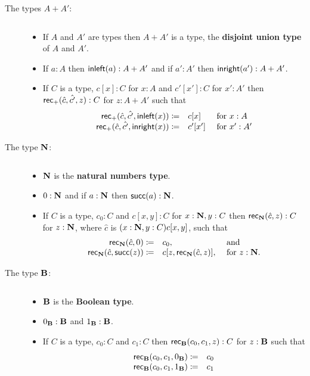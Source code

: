 {{\begin{description}
\item[The types $A+A'$:] $\;$
\begin{itemize}
\item If $A$ and $A'$ are types then $A+A'$ is a type, the {\bf disjoint union
type} of $A$ and $A'$.
\item If $a:A$ then ${\sf inleft}(a):A+A'$ and if $a':A'$ then ${\sf inright}(a'):A+A'$.
\item If $C$ is a type, $c[x]:C$ for $x:A$ and $c'[x']:C$ for $x':A'$ then 
${\sf rec}_+(\hat{c},\hat{c'},z):C$ for $z:A+A'$ such that
  \[\begin{array}{rll}
{\sf rec}_+(\hat{c},\hat{c'},{\sf inleft}(x))  \coloneqq& c[x]  &\mbox{ for }x:A\\
{\sf rec}_+(\hat{c},\hat{c'},{\sf inright}(x)) \coloneqq& c'[x']&\mbox{ for }x':A'
  \end{array}\]
\end{itemize}

\item[The type ${\bf N}$:] $\;$
\begin{itemize}
\item ${\bf N}$ is the {\bf natural numbers type}.
\item $0:{\bf N}$ and if $a:{\bf N}$ then ${\sf succ}(a):{\bf N}$.
\item If $C$ is a type, $c_0:C$ and $c[x,y]:C$ for $x:{\bf N},y:C$ then
${\sf rec}_{\bf N}(\hat{c},z):C$ for $z:{\bf N}$, where $\hat{c}$ is $(x:{\bf N},y:C)c[x,y]$,
such that
  \[ \begin{array}{rll}
{\sf rec}_{\bf N}(\hat{c},0) \coloneqq& c_0, &\mbox{ and}\\
{\sf rec}_{\bf N}(\hat{c},{\sf succ}(z))\coloneqq& c[z,{\sf rec}_{\bf N}(\hat{c},z)], &\mbox{ for } z:{\bf N} .
  \end{array}\]
\end{itemize}

\newpage

\item[The type ${\bf B}$:] $\;$
\begin{itemize}
\item ${\bf B}$ is the {\bf Boolean type}.
\item $0_{\bf B}:{\bf B}$ and $1_{\bf B}:{\bf B}$.
\item If $C$ is a type, $c_0:C$ and $c_1:C$ then ${\sf rec}_{\bf B}(c_0,c_1,z):C$ for $z:{\bf B}$ such that
 \[ \begin{array}{rl}
{\sf rec}_{\bf B}(c_0,c_1,0_{\bf B}) \coloneqq& c_0\\
{\sf rec}_{\bf B}(c_0,c_1,1_{\bf B}) \coloneqq& c_1
  \end{array}\]
\end{itemize}


\end{description}}}

